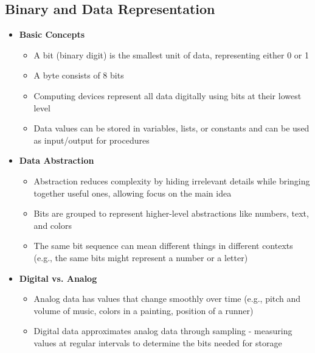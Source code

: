 \subsection*{Binary and Data Representation}
\begin{itemize}
    \item \textbf{Basic Concepts}
        \begin{itemize}
            \item A bit (binary digit) is the smallest unit of data, representing either 0 or 1 %
            \item A byte consists of 8 bits %
            \item Computing devices represent all data digitally using bits at their lowest level %
            \item Data values can be stored in variables, lists, or constants and can be used as input/output for procedures %
        \end{itemize}
    
    \item \textbf{Data Abstraction}
        \begin{itemize}
            \item Abstraction reduces complexity by hiding irrelevant details while bringing together useful ones, allowing focus on the main idea %
            \item Bits are grouped to represent higher-level abstractions like numbers, text, and colors %
            \item The same bit sequence can mean different things in different contexts (e.g., the same bits might represent a number or a letter) %
        \end{itemize}
        
    \item \textbf{Digital vs. Analog}
        \begin{itemize}
            \item Analog data has values that change smoothly over time (e.g., pitch and volume of music, colors in a painting, position of a runner) %
            \item Digital data approximates analog data through sampling - measuring values at regular intervals to determine the bits needed for storage %
        \end{itemize}
\end{itemize}

